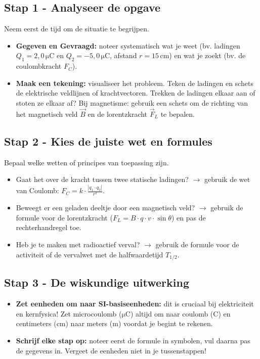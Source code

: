 \documentclass{ximera}
\begin{document}
\subsection*{Stap 1 - Analyseer de opgave}
Neem eerst de tijd om de situatie te begrijpen.
\begin{itemize}
  \item \textbf{Gegeven en Gevraagd:} noteer systematisch wat je weet (bv. ladingen $Q_1 = 2,0 \mathrm{\, \mu C}$ en $Q_2 = -5,0 \mathrm{\, \mu C}$, afstand $r = 15 \mathrm{\, cm}$) en wat je zoekt (bv. de coulombkracht $F_C$).
  \item \textbf{Maak een tekening:} visualiseer het probleem.  
  Teken de ladingen en schets de elektrische veldlijnen of krachtvectoren. Trekken de ladingen elkaar aan of stoten ze elkaar af? Bij magnetisme: gebruik een schets om de richting van het magnetisch veld $\vec{B}$ en de lorentzkracht $\vec{F}_L$ te bepalen.
\end{itemize}

\subsection*{Stap 2 - Kies de juiste wet en formules}
Bepaal welke wetten of principes van toepassing zijn.
\begin{itemize}
  \item Gaat het over de kracht tussen twee statische ladingen? $\rightarrow$ gebruik de wet van Coulomb: $F_C = k \cdot \frac{|q_1 \cdot q_2|}{r^2}$.
  \item Beweegt er een geladen deeltje door een magnetisch veld? $\rightarrow$ gebruik de formule voor de lorentzkracht ($F_L = B \cdot q \cdot v \cdot \sin\theta$) en pas de rechterhandregel toe.
  \item Heb je te maken met radioactief verval? $\rightarrow$ gebruik de formule voor de activiteit of de vervalwet met de halfwaardetijd $T_{1/2}$.
\end{itemize}

\subsection*{Stap 3 - De wiskundige uitwerking}
\begin{itemize}
  \item \textbf{Zet eenheden om naar SI-basiseenheden:} dit is cruciaal bij elektriciteit en kernfysica! Zet microcoulomb ($\mathrm{\mu C}$) altijd om naar coulomb ($\mathrm{C}$) en centimeters ($\mathrm{cm}$) naar meters ($\mathrm{m}$) voordat je begint te rekenen.
  \item \textbf{Schrijf elke stap op:} noteer eerst de formule in symbolen, vul daarna pas de gegevens in. Vergeet de eenheden niet in je tussenstappen!
\end{itemize}
\end{document}
